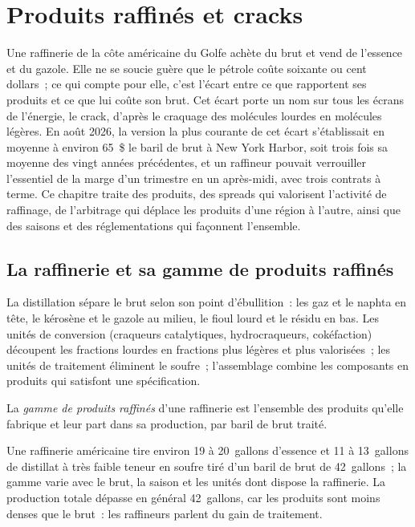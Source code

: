 \chapter{Produits raffinés et cracks}\label{ch:m3:refined-products-and-cracks}

Une raffinerie de la côte américaine du Golfe achète du brut et vend de l'essence et du gazole. Elle
ne se soucie guère que le pétrole coûte soixante ou cent dollars~; ce qui compte pour elle, c'est
l'écart entre ce que rapportent ses produits et ce que lui coûte son brut. Cet
écart porte un nom sur tous les écrans de l'énergie, le crack, d'après le craquage
des molécules lourdes en molécules légères. En août 2026, la version la plus courante de cet
écart s'établissait en moyenne à environ 65~\$ le baril de brut à New York Harbor, soit trois fois sa
moyenne des vingt années précédentes, et un raffineur pouvait verrouiller l'essentiel de la marge
d'un trimestre en un après-midi, avec trois contrats à terme. Ce chapitre traite des
produits, des spreads qui valorisent l'activité de raffinage, de l'arbitrage qui déplace
les produits d'une région à l'autre, ainsi que des saisons et des réglementations qui façonnent l'ensemble.

\section{La raffinerie et sa gamme de produits raffinés}

La distillation sépare le brut selon son point d'ébullition~: les gaz et le naphta en tête,
le kérosène et le gazole au milieu, le fioul lourd et le résidu en bas.
Les unités de conversion (craqueurs catalytiques, hydrocraqueurs, cokéfaction) découpent les
fractions lourdes en fractions plus légères et plus valorisées~; les unités de traitement éliminent le
soufre~; l'assemblage combine les composants en produits qui satisfont une spécification.

\begin{definition}\label{def:m3:refined-products-and-cracks:slate}
La \emph{gamme de produits raffinés} d'une raffinerie est l'ensemble des produits qu'elle
fabrique et leur part dans sa production, par baril de brut traité.
\end{definition}

Une raffinerie américaine tire environ 19 à 20~gallons d'essence et 11 à 13~gallons
de distillat à très faible teneur en soufre tiré d'un baril de brut de 42~gallons~; la gamme varie
avec le brut, la saison et les unités dont dispose la raffinerie. La production totale
dépasse en général 42~gallons, car les produits sont moins denses que le brut~:
les raffineurs parlent du gain de traitement.

